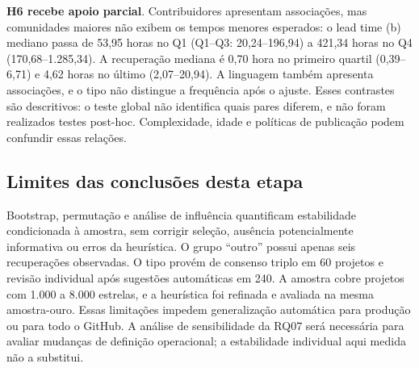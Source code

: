 \textbf{H6 recebe apoio parcial}. Contribuidores apresentam associações, mas
comunidades maiores não exibem os tempos menores esperados: o lead time (b)
mediano passa de 53,95 horas no Q1 (Q1--Q3: 20,24--196,94) a 421,34 horas no Q4
(170,68--1.285,34). A recuperação mediana é 0,70 hora no primeiro quartil
(0,39--6,71) e 4,62 horas no último (2,07--20,94). A linguagem também apresenta
associações, e o tipo não distingue a frequência após o ajuste. Esses contrastes
são descritivos: o teste global não identifica quais pares diferem, e não foram
realizados testes post-hoc. Complexidade, idade e políticas de publicação podem
confundir essas relações.

\subsection{Limites das conclusões desta etapa}

Bootstrap, permutação e análise de influência quantificam estabilidade
condicionada à amostra, sem corrigir seleção, ausência potencialmente informativa
ou erros da heurística. O grupo ``outro'' possui apenas seis recuperações
observadas. O tipo provém de consenso triplo em 60 projetos e revisão individual
após sugestões automáticas em 240. A amostra cobre projetos com 1.000 a 8.000
estrelas, e a heurística foi refinada e avaliada na mesma amostra-ouro. Essas
limitações impedem generalização automática para produção ou para todo o GitHub.
A análise de sensibilidade da RQ07 será necessária para avaliar mudanças de
definição operacional; a estabilidade individual aqui medida não a substitui.
